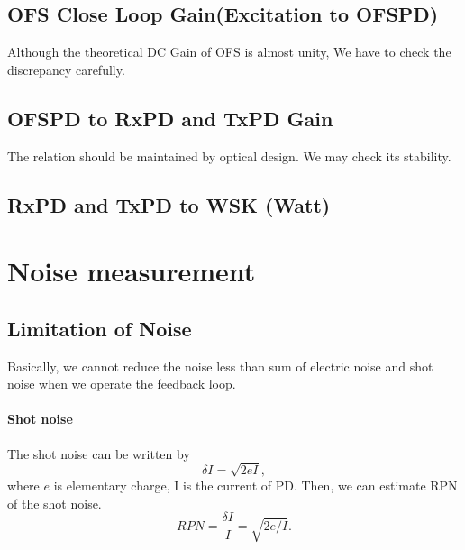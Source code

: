 \subsection{OFS Close Loop Gain(Excitation to OFSPD)}
    Although the theoretical DC Gain of OFS is almost unity, We have to check the discrepancy carefully. 
\subsection{OFSPD to RxPD and TxPD Gain}
    The relation should be maintained by optical design. We may check its stability.
\subsection{RxPD and TxPD to WSK (Watt)}





\section{Noise measurement}
\subsection{Limitation of Noise}
Basically, we cannot reduce the noise less than sum of electric noise and shot noise when we operate the feedback loop.
\paragraph{Shot noise}
The shot noise can be written by
\begin{equation}
\delta I=\sqrt{2eI},
\end{equation}
where $e$ is elementary charge, I is the current of PD. Then, we can estimate RPN of the shot noise.
\begin{equation}
RPN=\frac{\delta I}{I}=\sqrt{2e/I}.
\end{equation}

			\begin{center}
			\end{center}
